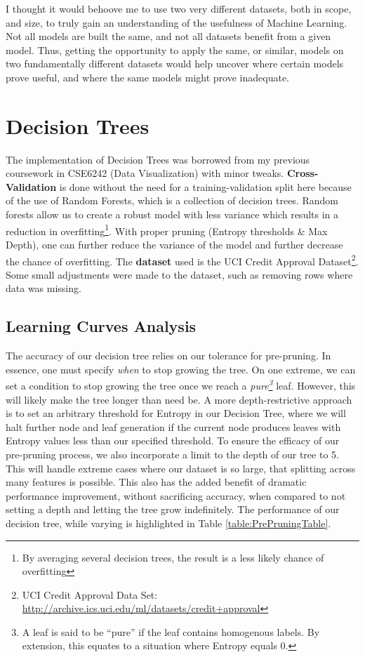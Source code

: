 \documentclass[letterpaper,12pt]{article}
\begin{document}
I thought it would behoove me to use two very different datasets, both in scope, and size, to truly gain an understanding of the usefulness of Machine Learning.  Not all models are built the same, and not all datasets benefit from a given model.  Thus, getting the opportunity to apply the same, or similar, models on two fundamentally different datasets would help uncover where certain models prove useful, and where the same models might prove inadequate.  

\section{Decision Trees}

The implementation of Decision Trees was borrowed from my previous coursework in CSE6242 (Data Visualization) with minor tweaks.
\textbf{Cross-Validation} is done without the need for a training-validation split here because of the use of Random Forests, which is a collection of decision trees.  Random forests allow us to create a robust model with less variance which results in a reduction in overfitting\footnote{By averaging several decision trees, the result is a less likely chance of overfitting}.  With proper pruning (Entropy thresholds \& Max Depth), one can further reduce the variance of the model and further decrease the chance of overfitting.  The \textbf{dataset} used is the UCI Credit Approval Dataset\footnote{UCI Credit Approval Data Set: \url{http://archive.ics.uci.edu/ml/datasets/credit+approval}}.  Some small adjustments were made to the dataset, such as removing rows where data was missing.  

\subsection{Learning Curves Analysis}
The accuracy of our decision tree relies on our tolerance for pre-pruning.  In essence, one must specify \emph{when} to stop growing the tree.  On one extreme, we can set a condition to stop growing the tree once we reach a \emph{pure\footnote{A leaf is said to be ``pure'' if the leaf contains homogenous labels.  By extension, this equates to a situation where Entropy equals 0.}} leaf.  However, this will likely make the tree longer than need be.  A more depth-restrictive approach is to set an arbitrary threshold for Entropy in our Decision Tree, where we will halt further node and leaf generation if the current node produces leaves with Entropy values less than our specified threshold.  To ensure the efficacy of our pre-pruning process, we also incorporate a limit to the depth of our tree to 5.  This will handle extreme cases where our dataset is so large, that splitting across many features is possible. This also has the added benefit of dramatic performance improvement, without sacrificing accuracy, when compared to not setting a depth and letting the tree grow indefinitely.  The performance of our decision tree, while varying  is highlighted in Table \ref{table:PrePruningTable}.
\end{document}
